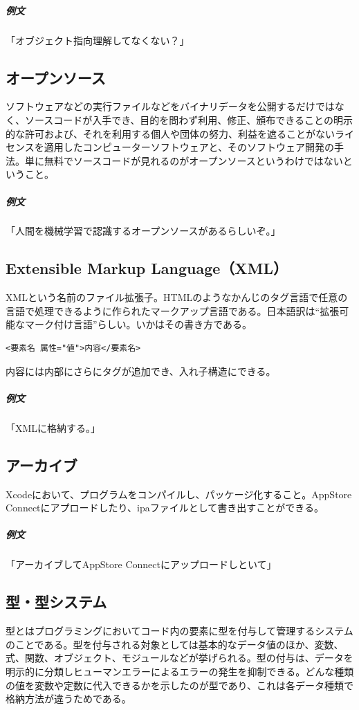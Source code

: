 \documentclass[a4paper]{ltjsreport}
\begin{document}
\subparagraph{例文} 「オブジェクト指向理解してなくない？」

\subsection{オープンソース}
ソフトウェアなどの実行ファイルなどをバイナリデータを公開するだけではなく、ソースコードが入手でき、目的を問わず利用、修正、頒布できることの明示的な許可および、それを利用する個人や団体の努力、利益を遮ることがないライセンスを適用したコンピューターソフトウェアと、そのソフトウェア開発の手法。単に無料でソースコードが見れるのがオープンソースというわけではないということ。

\subparagraph{例文} 「人間を機械学習で認識するオープンソースがあるらしいぞ。」

\subsection{Extensible Markup Language（XML）}
XMLという名前のファイル拡張子。HTMLのようなかんじのタグ言語で任意の言語で処理できるように作られたマークアップ言語である。日本語訳は``拡張可能なマーク付け言語''らしい。いかはその書き方である。

\lstset{language=bash}
\begin{lstlisting}
<要素名 属性="値">内容</要素名>
\end{lstlisting}

内容には内部にさらにタグが追加でき、入れ子構造にできる。

\subparagraph{例文} 「XMLに格納する。」

\subsection{アーカイブ}
Xcodeにおいて、プログラムをコンパイルし、パッケージ化すること。AppStore Connectにアプロードしたり、ipaファイルとして書き出すことができる。

\subparagraph{例文} 「アーカイブしてAppStore Connectにアップロードしといて」

\subsection{型・型システム}
型とはプログラミングにおいてコード内の要素に型を付与して管理するシステムのことである。型を付与される対象としては基本的なデータ値のほか、変数、式、関数、オブジェクト、モジュールなどが挙げられる。型の付与は、データを明示的に分類しヒューマンエラーによるエラーの発生を抑制できる。どんな種類の値を変数や定数に代入できるかを示したのが型であり、これは各データ種類で格納方法が違うためである。
\end{document}
